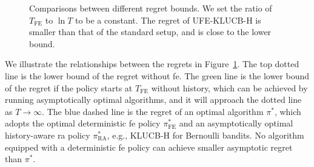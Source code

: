 \documentclass[twoside,11pt]{article}
\newcommand{\Tfe}{T_{\mathrm{FE}}}
\newcommand{\Saved}{\mathrm{Save}}
\newcommand{\FE}{\textrm{FE}}
\newcommand{\RA}{\textrm{RA}}
\newcommand{\ouralg}{\textsc{UFE-KLUCB-H}}
\newcommand{\klucbh}{\textsc{KLUCB-H}}
\begin{document}
\begin{figure}[t]
\begin{center}
        \caption{Comparisons between different regret bounds. We set the ratio of $\Tfe$ to $ \ln T$  to be a   constant.
        The regret of \ouralg{} is smaller than that of the standard setup, and is close to the lower bound.
        }
        \label{fig:optimal_FE}
    \end{center}
\end{figure}
We illustrate the relationships between the regrets in Figure~\ref{fig:optimal_FE}. 
The top dotted line is the lower bound of the regret without \ac{fe}.
The green line is the lower bound of the regret if the policy starts at  $\Tfe$ without history, which can be achieved by running asymptotically optimal algorithms, and it will approach the dotted line as $T\to\infty$.
The blue dashed line is the regret of an optimal algorithm $\pi^*$, which adopts the optimal deterministic \ac{fe} policy $\pi_{\FE}^*$ and an asymptotically optimal history-aware \ac{ra} policy $\pi_{\RA}^*$, e.g., \klucbh{} for Bernoulli bandits.
No algorithm equipped with a deterministic \ac{fe}  policy can achieve smaller asymptotic regret than $\pi^*$.
\end{document}
